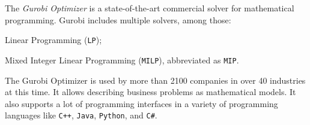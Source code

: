 \documentclass[../../thesis.tex]{subfiles}
\begin{document}
The \emph{Gurobi Optimizer} \cite{gurobi} is a state-of-the-art commercial solver for mathematical programming. 
Gurobi includes multiple solvers, among those:
\begin{enumerate*}[label=(\roman*)]
  \item Linear Programming (\texttt{LP});
  \item Mixed Integer Linear Programming (\texttt{MILP}), abbreviated as \texttt{MIP}.
\end{enumerate*}


The Gurobi Optimizer is used by more than 2100 companies in over 40 industries at this time. It allows 
describing business problems as mathematical models. It also supports a lot of programming interfaces
in a variety of programming languages like \texttt{C++}, \texttt{Java}, \texttt{Python}, and \texttt{C\#}.
\end{document}
